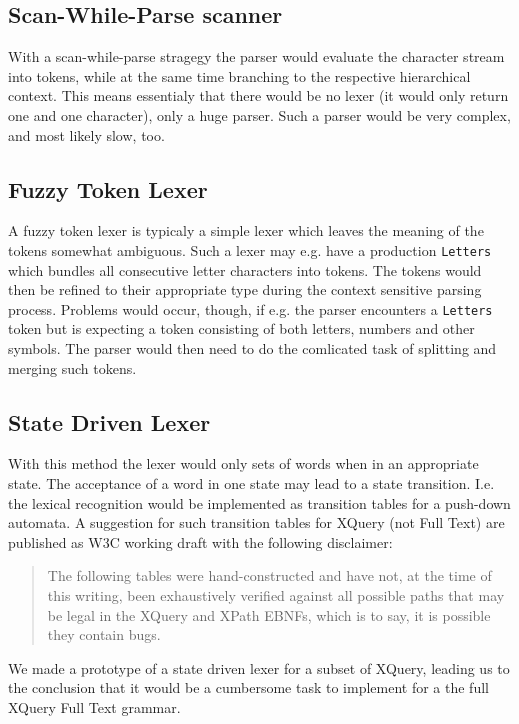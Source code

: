 \subsection{Scan-While-Parse scanner}
\label{sect:ambiguousgrammar:scanWhileParse}
With a scan-while-parse stragegy the parser would evaluate the character stream into tokens, while at the same time branching to the respective hierarchical context. This means essentialy that there would be no lexer (it would only return one and one character), only a huge parser. Such a parser would be very complex, and most likely slow, too.

\subsection{Fuzzy Token Lexer}
A fuzzy token lexer is typicaly a simple lexer which leaves the meaning of the tokens somewhat ambiguous. Such a lexer may e.g. have a production \verb!Letters! which bundles all consecutive letter characters into tokens. The tokens would then be refined to their appropriate type during the context sensitive parsing process. Problems would occur, though, if e.g. the parser encounters a \verb!Letters! token but is expecting a token consisting of both letters, numbers and other symbols. The parser would then need to do the comlicated task of splitting and merging such tokens.

\subsection{State Driven Lexer}
\label{sect:amiguousgrammar:stateDriven}
With this method the lexer would only sets of words when in an appropriate state. The acceptance of a word in one state may lead to a state transition. I.e. the lexical recognition would be implemented as transition tables for a push-down automata. A suggestion for such transition tables for XQuery (not Full Text) are published as W3C working draft\cite{createTokenizer} with the following disclaimer:
\begin{quote}
The following tables were hand-constructed and have not, at the time of this writing, been exhaustively verified against all possible paths that may be legal in the XQuery and XPath EBNFs, which is to say, it is possible they contain bugs.
\end{quote}
We made a prototype of a state driven lexer for a subset of XQuery, leading us to the conclusion that it would be a cumbersome task to implement for a the full XQuery Full Text grammar.

